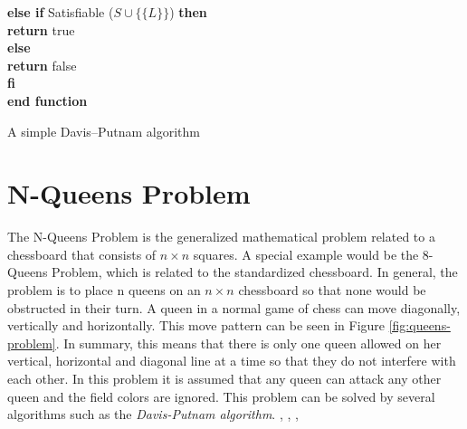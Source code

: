 \begin{listing}[h!]
    \hspace*{0.5cm} \textbf{else if} Satisfiable ($S \cup \{\{L\}\}$) \textbf{then}\\
      \hspace*{1.0cm} \textbf{return} true\\
    \hspace*{0.5cm} \textbf{else}\\
      \hspace*{1.0cm} \textbf{return} false\\
    \hspace*{0.5cm} \textbf{fi}\\
  \textbf{end function}
  \caption{A simple Davis–Putnam algorithm \cite{Zhang2000}}
  \label{code:recursiveDavisPutnam}
\end{listing}

\section{N-Queens Problem}
\label{sec:sciQueens}
The N-Queens Problem is the generalized mathematical problem related to a chessboard that consists of $n \times n$ squares. A special example would be the 8-Queens Problem, which is related to the standardized chessboard. In general, the problem is to place n queens on an $n \times n$ chessboard so that none would be obstructed in their turn. A queen in a normal game of chess can move diagonally, vertically and horizontally. This move pattern can be seen in Figure \ref{fig:queens-problem}. In summary, this means that there is only one queen allowed on her vertical, horizontal and diagonal line at a time so that they do not interfere with each other. In this problem it is assumed that any queen can attack any other queen and the field colors are ignored. This problem can be solved by several algorithms such as the \textit{Davis-Putnam algorithm}. \cite{Bell2009}, \cite{Watkins2012}, \cite[146\psq]{Nudelman1995}, \cite{Stroetman2019}


